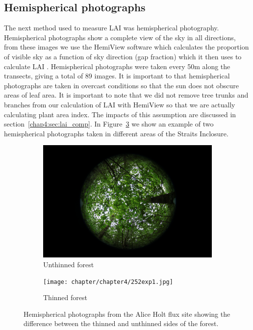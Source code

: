 \subsection{Hemispherical photographs} \label{chap4:sec:hemi_photos}

The next method used to measure LAI was hemispherical photography. Hemispherical photographs show a complete view of the sky in all directions, from these images we use the HemiView software \citep{rich1999hemiview} which calculates the proportion of visible sky as a function of sky direction (gap fraction) which it then uses to calculate LAI \citep{Jonckheere2004}. Hemispherical photographs were taken every 50m along the transects, giving a total of 89 images. It is important to that hemispherical photographs are taken in overcast conditions so that the sun does not obscure areas of leaf area. It is important to note that we did not remove tree trunks and branches from our calculation of LAI with HemiView so that we are actually calculating plant area index. The impacts of this assumption are discussed in section~\ref{chap4:sec:lai_comp}. In Figure~\ref{chap4:fig:hemiphotos} we show an example of two hemispherical photographs taken in different areas of the Straits Inclosure.

\begin{figure}[ht]
\centering
\begin{subfigure}{.5\textwidth}
  \centering
  \includegraphics[width=.9\linewidth]{chapter/chapter4/043exp2.jpg}
  \caption{Unthinned forest}
  \label{chap4:fig:sub1}
\end{subfigure}%
\begin{subfigure}{.5\textwidth}
  \centering
  \texttt{[image: chapter/chapter4/252exp1.jpg]}
  \caption{Thinned forest}
  \label{chap4:fig:sub2}
\end{subfigure}
\caption{Hemispherical photographs from the Alice Holt flux site showing the difference between the thinned and unthinned sides of the forest.}
\label{chap4:fig:hemiphotos}
\end{figure}

